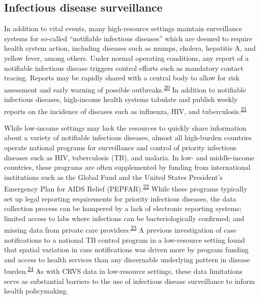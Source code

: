 \documentclass[
]{article}
\begin{document}
\hypertarget{infectious-disease-surveillance}{%
\subsection{Infectious disease surveillance}\label{infectious-disease-surveillance}}

In addition to vital events, many high-resource settings maintain surveillance systems for so-called ``notifiable infectious diseases'' which are deemed to require health system action, including diseases such as mumps, cholera, hepatitis A, and yellow fever, among others. Under normal operating conditions, any report of a notifiable infectious disease triggers control efforts such as mandatory contact tracing. Reports may be rapidly shared with a central body to allow for risk assessment and early warning of possible outbreaks.\textsuperscript{\protect\hyperlink{ref-Vlieg2017}{20}} In addition to notifiable infectious diseases, high-income health systems tabulate and publish weekly reports on the incidence of diseases such as influenza, HIV, and tuberculosis.\textsuperscript{\protect\hyperlink{ref-Thacker1989}{21}}

While low-income settings may lack the resources to quickly share information about a variety of notifiable infectious diseases, almost all high-burden countries operate national programs for surveillance and control of priority infectious diseases such as HIV, tuberculosis (TB), and malaria. In low- and middle-income countries, these programs are often supplemented by funding from international institutions such as the Global Fund and the United States President's Emergency Plan for AIDS Relief (PEPFAR).\textsuperscript{\protect\hyperlink{ref-Mauch2010}{22}} While these programs typically set up legal reporting requirements for priority infectious diseases, the data collection process can be hampered by a lack of electronic reporting systems; limited access to labs where infections can be bacteriologically confirmed; and missing data from private care providers.\textsuperscript{\protect\hyperlink{ref-Uplekar2016}{23}} A previous investigation of case notifications to a national TB control program in a low-resource setting found that spatial variation in case notifications was driven more by program funding and access to health services than any discernable underlying pattern in disease burden.\textsuperscript{\protect\hyperlink{ref-Rood2019}{24}} As with CRVS data in low-resource settings, these data limitations serve as substantial barriers to the use of infectious disease surveillance to inform health policymaking.
\end{document}
